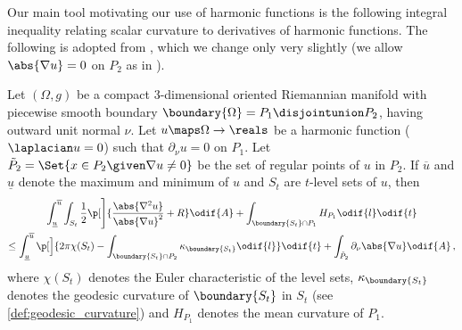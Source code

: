 \documentclass[titlepage,numbers=noenddot,oneside,%
cleardoublepage=empty,paper=a4,fontsize=11pt,%
english,%
]{scrartcl}
\newcommand*{\mathcomma}{\,,}
\begin{document}
Our main tool motivating our use of harmonic functions is the following integral inequality relating scalar curvature to derivatives of harmonic functions. The following is adopted from  \cite[Proposition 4.2]{brayHarmonicFunctionsMass2019}, which we change only very slightly (we allow \( \abs{\nabla u}=0 \) on \( P_2 \) as in \cite[Proposition 3.2]{hirschSpacetimeHarmonicFunctions2021}).
{\newcommand{\maxu}{\overline{u}}
\newcommand{\minu}{\underline{u}}
\newcommand{\nonzeroboundary}{\partial_{\neq 0}\Omega}
\begin{proposition}\label{prop:main_inequality}
    Let \( (\Omega,g) \) be a compact 3-dimensional oriented Riemannian manifold with piecewise smooth boundary \( \boundary{\Omega}=P_1\disjointunion P_2 \), having outward unit normal \( \nu \). Let \( u\maps \Omega\to \reals \) be a harmonic function (\ie \( \laplacian u=0 \)) such that \( \partial_{\nu}u=0 \) on \( P_1 \). Let \( \tilde{P}_2=\Set{x\in P_2\given \nabla u\neq 0} \) be the set of regular points of \( u \) in \( P_2 \). If \( \maxu \) and \( \minu \) denote the maximum and minimum of \( u \) and \( S_t \) are \( t \)-level sets of \( u \), then
    \begin{multline*}
        \int_{\minu}^{\maxu} \int_{S_t} \frac{1}{2}\p[\Bigg]{\frac{\abs{\nabla^2 u}}{\abs{\nabla u}^2}+R }\odif{A}+\int_{\boundary{S_t}\cap P_1}H_{P_1}\odif{l}\odif{t}\\
        \leq\int_{\minu}^{\maxu}\p[\Big]{2\pi \chi(S_t)-\int _{\boundary{S_t} \cap P_2}\kappa_{\boundary{S_t}}\odif{l}}\odif{t}+ \int_{\tilde{P}_2}\partial_{\nu} \abs{\nabla u}\odif{A}\mathcomma
    \end{multline*} 
    where \( \chi(S_t) \) denotes the Euler characteristic of the level sets, \( \kappa_{\boundary{S_t}} \) denotes the geodesic curvature of \( \boundary{S_t} \) in \( S_t \) (see \cref{def:geodesic_curvature}) and \( H_{P_1} \) denotes the mean curvature of \( P_1 \).
\end{proposition}

}
\end{document}

